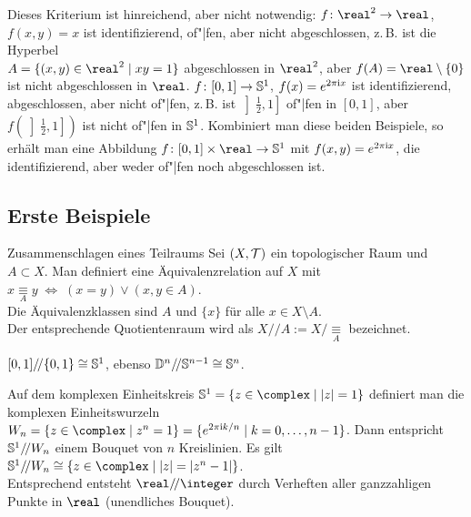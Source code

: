 \begin{Bem}
    Dieses Kriterium ist hinreichend, aber nicht notwendig:
    $f\colon \real^2 \rightarrow \real$, $f(x, y) = x$ ist identifizierend,
    of"|fen, aber nicht abgeschlossen,
    z.\,B. ist die Hyperbel \\
    $A = \{(x, y) \in \real^2 \;|\; xy = 1\}$ abgeschlossen in $\real^2$, aber
    $f(A) = \real \setminus \{0\}$ ist nicht abgeschlossen in $\real$.
    $f\colon [0, 1] \rightarrow \mathbb{S}^1$, $f(x) = e^{2\pi \mathrm{i} x}$ ist
    identifizierend, abgeschlossen, aber nicht of"|fen,
    z.\,B. ist $\left]\frac{1}{2}, 1\right]$ of"|fen in $[0,1]$, aber
    $f\left(\left]\frac{1}{2}, 1\right]\right)$ ist nicht of"|fen in
    $\mathbb{S}^1$.
    Kombiniert man diese beiden Beispiele, so erhält man eine Abbildung
    $f\colon [0, 1] \times \real \rightarrow \sphere^1$ mit
    $f(x, y) = e^{2\pi \mathrm{i} x}$, die identifizierend,
    aber weder of"|fen noch abgeschlossen ist.
\end{Bem}

\subsection{%
    Erste Beispiele%
}

\begin{Def}{Zusammenschlagen eines Teilraums}
    Sei $(X, \mathcal{T})$ ein topologischer Raum und $A \subset X$.
    Man definiert eine Äquivalenzrelation auf $X$ mit
    $x \underset{A}{\equiv} y \;\Leftrightarrow\;
    (x = y) \lor (x, y \in A)$. \\
    Die Äquivalenzklassen sind $A$ und $\{x\}$ für alle
    $x \in X \setminus A$. \\
    Der entsprechende Quotientenraum wird als
    $X/\!/A := X/\!\underset{A}{\equiv}$ bezeichnet.
\end{Def}

\begin{Bsp}
    $[0, 1]/\!/\{0,1\} \cong \mathbb{S}^1$, ebenso
    $\mathbb{D}^n/\!/\mathbb{S}^{n-1} \cong \mathbb{S}^n$.
\end{Bsp}

\begin{Bsp}
    Auf dem komplexen Einheitskreis
    $\sphere^1 = \{z \in \complex \;|\; |z| = 1\}$ definiert man die
    komplexen Einheitswurzeln $W_n = \{z \in \complex \;|\; z^n = 1\} =
    \{e^{2 \pi \i k/n} \;|\; k = 0, \dotsc, n - 1\}$.
    Dann entspricht $\mathbb{S}^1 /\!/ W_n$ einem Bouquet von $n$ Kreislinien.
    Es gilt $\sphere^1 /\!/ W_n \cong
    \{z \in \complex \;|\; |z| = |z^n - 1|\}$. \\
    Entsprechend entsteht $\real /\!/ \integer$ durch Verheften aller
    ganzzahligen Punkte in $\real$
    (unendliches Bouquet).
\end{Bsp}

